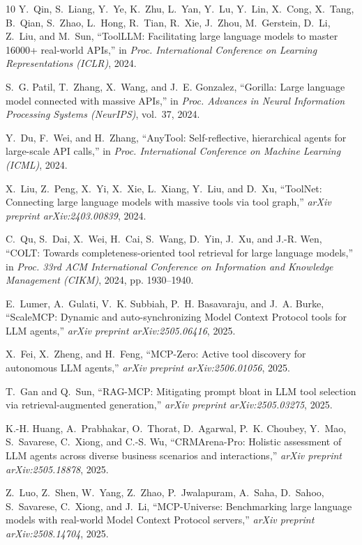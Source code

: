 \documentclass[conference,10pt]{IEEEtran}
\begin{document}
\begin{thebibliography}{10}
Y.~Qin, S.~Liang, Y.~Ye, K.~Zhu, L.~Yan, Y.~Lu, Y.~Lin, X.~Cong, X.~Tang, B.~Qian, S.~Zhao, L.~Hong, R.~Tian, R.~Xie, J.~Zhou, M.~Gerstein, D.~Li, Z.~Liu, and M.~Sun, ``{ToolLLM}: Facilitating large language models to master 16000+ real-world {APIs},'' in \emph{Proc. International Conference on Learning Representations (ICLR)}, 2024.

S.~G. Patil, T.~Zhang, X.~Wang, and J.~E. Gonzalez, ``{Gorilla}: Large language model connected with massive {APIs},'' in \emph{Proc. Advances in Neural Information Processing Systems (NeurIPS)}, vol.~37, 2024.

Y.~Du, F.~Wei, and H.~Zhang, ``{AnyTool}: Self-reflective, hierarchical agents for large-scale {API} calls,'' in \emph{Proc. International Conference on Machine Learning (ICML)}, 2024.

X.~Liu, Z.~Peng, X.~Yi, X.~Xie, L.~Xiang, Y.~Liu, and D.~Xu, ``{ToolNet}: Connecting large language models with massive tools via tool graph,'' \emph{arXiv preprint arXiv:2403.00839}, 2024.

C.~Qu, S.~Dai, X.~Wei, H.~Cai, S.~Wang, D.~Yin, J.~Xu, and J.-R. Wen, ``{COLT}: Towards completeness-oriented tool retrieval for large language models,'' in \emph{Proc. 33rd ACM International Conference on Information and Knowledge Management (CIKM)}, 2024, pp. 1930--1940.

E.~Lumer, A.~Gulati, V.~K. Subbiah, P.~H. Basavaraju, and J.~A. Burke, ``{ScaleMCP}: Dynamic and auto-synchronizing Model Context Protocol tools for {LLM} agents,'' \emph{arXiv preprint arXiv:2505.06416}, 2025.

X.~Fei, X.~Zheng, and H.~Feng, ``{MCP-Zero}: Active tool discovery for autonomous {LLM} agents,'' \emph{arXiv preprint arXiv:2506.01056}, 2025.

T.~Gan and Q.~Sun, ``{RAG-MCP}: Mitigating prompt bloat in {LLM} tool selection via retrieval-augmented generation,'' \emph{arXiv preprint arXiv:2505.03275}, 2025.

K.-H. Huang, A.~Prabhakar, O.~Thorat, D.~Agarwal, P.~K. Choubey, Y.~Mao, S.~Savarese, C.~Xiong, and C.-S. Wu, ``{CRMArena-Pro}: Holistic assessment of {LLM} agents across diverse business scenarios and interactions,'' \emph{arXiv preprint arXiv:2505.18878}, 2025.

Z.~Luo, Z.~Shen, W.~Yang, Z.~Zhao, P.~Jwalapuram, A.~Saha, D.~Sahoo, S.~Savarese, C.~Xiong, and J.~Li, ``{MCP-Universe}: Benchmarking large language models with real-world Model Context Protocol servers,'' \emph{arXiv preprint arXiv:2508.14704}, 2025.


\end{thebibliography}
\end{document}
